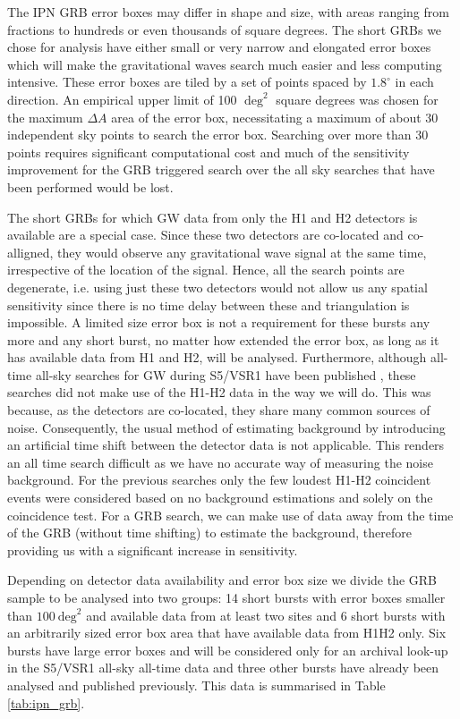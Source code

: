 \documentclass[a4paper]{jpconf}
\begin{document}
The IPN GRB error boxes may differ in shape and size, with areas ranging from fractions to hundreds or even thousands of square degrees. The short GRBs we chose for analysis have either small or very narrow and elongated error boxes which will make the gravitational waves search much easier and less computing intensive.  These error boxes are tiled by a set of points spaced by $1.8^{\circ}$ in each direction.  An empirical upper limit of 100 $\deg^{2}$ square degrees was chosen for the maximum $\Delta A$ area of the error box, necessitating a maximum of about 30 independent sky points to search the error box.  Searching over more than 30 points requires significant computational cost and much of the sensitivity improvement for the GRB triggered search over the all sky searches that have been performed would be lost.

The short GRBs for which GW data from only the H1 and H2 detectors is available are a special case.  Since these two detectors are co-located and co-alligned, they would observe any gravitational wave signal at the same time, irrespective of the location of the signal. Hence, all the search points are degenerate, i.e. using just these two detectors would not allow us any spatial sensitivity since there is no time delay between these and triangulation is impossible. A limited size error box is not a requirement for these bursts any more and any short burst, no matter how extended the error box, as long as it has available data from H1 and H2, will be analysed. Furthermore, although all-time all-sky searches for GW during S5/VSR1 have been published \cite{Abadie:2010yba, Abbott:2009dk}, these searches did not make use of the H1-H2 data in the way we will do.  This was because, as the detectors are co-located, they share many common sources of noise.  Consequently, the usual method of estimating background by introducing an artificial time shift between the detector data is not applicable.  This renders an all time search difficult as we have no accurate way of measuring the noise background.  For the previous searches only the few loudest H1-H2 coincident events were considered based on no background estimations and solely on the coincidence test. For a GRB search, we can make use of data away from the time of the GRB (without time shifting) to estimate the background, therefore providing us with a significant increase in sensitivity.

Depending on detector data availability and error box size we divide the GRB sample to be analysed into two groups: 14 short bursts with error boxes smaller than $100~\mathrm{deg}^2$ and available data from at least two sites and 6 short bursts with an arbitrarily sized error box area that have available data from H1H2 only. Six bursts have large error boxes and will be considered only for an archival look-up in the S5/VSR1 all-sky all-time data and three other bursts have already been analysed and published previously. This data is summarised in Table \ref{tab:ipn_grb}.
\end{document}

